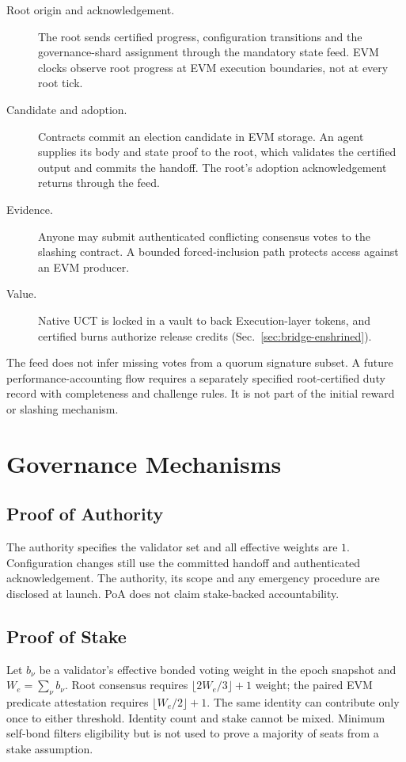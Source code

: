 \begin{description}
 \item[Root origin and acknowledgement.] The root sends certified progress, configuration transitions and the governance-shard assignment through the mandatory state feed. EVM clocks observe root progress at EVM execution boundaries, not at every root tick.
 \item[Candidate and adoption.] Contracts commit an election candidate in EVM storage. An agent supplies its body and state proof to the root, which validates the certified output and commits the handoff. The root's adoption acknowledgement returns through the feed.
 \item[Evidence.] Anyone may submit authenticated conflicting consensus votes to the slashing contract. A bounded forced-inclusion path protects access against an EVM producer.
 \item[Value.] Native UCT is locked in a vault to back Execution-layer tokens, and certified burns authorize release credits (Sec.~\ref{sec:bridge-enshrined}).
\end{description}

The feed does not infer missing votes from a quorum signature subset. A future performance-accounting flow requires a separately specified root-certified duty record with completeness and challenge rules. It is not part of the initial reward or slashing mechanism.

\chapter{Governance Mechanisms}

\section{Proof of Authority}\label{sec:gov-poa}

The authority specifies the validator set and all effective weights are $1$. Configuration changes still use the committed handoff and authenticated acknowledgement. The authority, its scope and any emergency procedure are disclosed at launch. PoA does not claim stake-backed accountability.

\section{Proof of Stake}\label{sec:gov-pos}

Let $b_\nu$ be a validator's effective bonded voting weight in the epoch snapshot and $W_e=\sum_\nu b_\nu$. Root consensus requires $\lfloor2W_e/3\rfloor+1$ weight; the paired EVM predicate attestation requires $\lfloor W_e/2\rfloor+1$. The same identity can contribute only once to either threshold. Identity count and stake cannot be mixed. Minimum self-bond filters eligibility but is not used to prove a majority of seats from a stake assumption.

